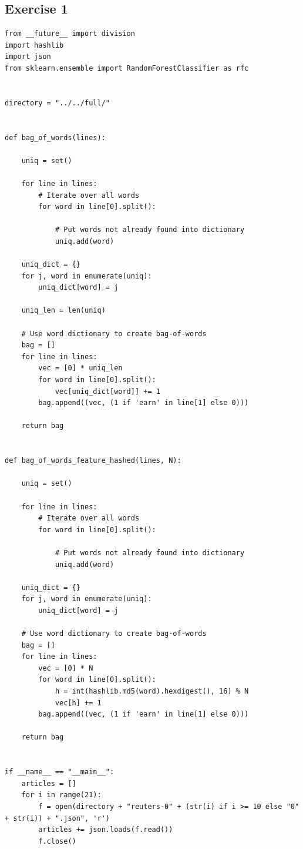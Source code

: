 \documentclass{article}
\begin{document}
\subsection{Exercise 1}
\label{sub:Exercise 1}

\begin{lstlisting}
from __future__ import division
import hashlib
import json
from sklearn.ensemble import RandomForestClassifier as rfc


directory = "../../full/"


def bag_of_words(lines):

    uniq = set()

    for line in lines:
        # Iterate over all words
        for word in line[0].split():

            # Put words not already found into dictionary
            uniq.add(word)

    uniq_dict = {}
    for j, word in enumerate(uniq):
        uniq_dict[word] = j

    uniq_len = len(uniq)

    # Use word dictionary to create bag-of-words
    bag = []
    for line in lines:
        vec = [0] * uniq_len
        for word in line[0].split():
            vec[uniq_dict[word]] += 1
        bag.append((vec, (1 if 'earn' in line[1] else 0)))

    return bag


def bag_of_words_feature_hashed(lines, N):

    uniq = set()

    for line in lines:
        # Iterate over all words
        for word in line[0].split():

            # Put words not already found into dictionary
            uniq.add(word)

    uniq_dict = {}
    for j, word in enumerate(uniq):
        uniq_dict[word] = j

    # Use word dictionary to create bag-of-words
    bag = []
    for line in lines:
        vec = [0] * N
        for word in line[0].split():
            h = int(hashlib.md5(word).hexdigest(), 16) % N
            vec[h] += 1
        bag.append((vec, (1 if 'earn' in line[1] else 0)))

    return bag


if __name__ == "__main__":
    articles = []
    for i in range(21):
        f = open(directory + "reuters-0" + (str(i) if i >= 10 else "0" + str(i)) + ".json", 'r')
        articles += json.loads(f.read())
        f.close()


\end{lstlisting}
\end{document}

